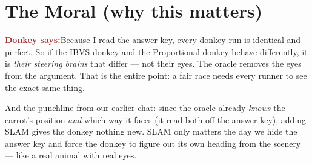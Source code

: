 \documentclass[11pt]{article}
\newcommand{\donkey}[1]{%
  \begin{mdframed}[backgroundcolor=brown!8, linecolor=brown!50, linewidth=1pt,
                   roundcorner=6pt, skipabove=8pt, skipbelow=8pt]
  \textbf{\textcolor{brown}{\large Donkey says:}}\quad #1
  \end{mdframed}}
\begin{document}
\section{The Moral (why this matters)}

\donkey{Because I read the answer key, every donkey-run is identical and perfect.
So if the IBVS donkey and the Proportional donkey behave differently, it is
\emph{their steering brains} that differ --- not their eyes. The oracle removes
the eyes from the argument. That is the entire point: a fair race needs every
runner to see the exact same thing.}

And the punchline from our earlier chat: since the oracle already \emph{knows} the
carrot's position \emph{and} which way it faces (it read both off the answer key),
adding SLAM gives the donkey nothing new. SLAM only matters the day we hide the
answer key and force the donkey to figure out its own heading from the scenery ---
like a real animal with real eyes.
\end{document}
